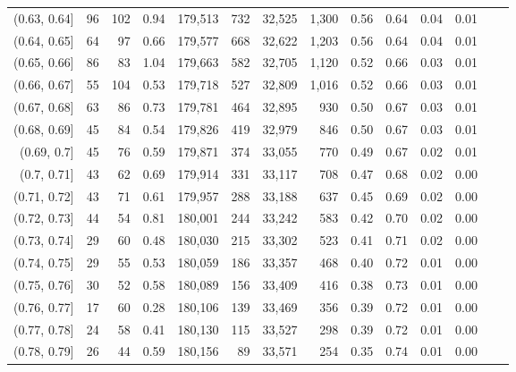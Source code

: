 \begin{tabular}{rrrrrrrrrrrrrr}
(0.63, 0.64]   &      96 &    102 &    0.94 &  179,513 &      732 &  32,525 &   1,300 &  0.56 &  0.64 &  0.04 &      0.01 \\
(0.64, 0.65]   &      64 &     97 &    0.66 &  179,577 &      668 &  32,622 &   1,203 &  0.56 &  0.64 &  0.04 &      0.01 \\
(0.65, 0.66]   &      86 &     83 &    1.04 &  179,663 &      582 &  32,705 &   1,120 &  0.52 &  0.66 &  0.03 &      0.01 \\
(0.66, 0.67]   &      55 &    104 &    0.53 &  179,718 &      527 &  32,809 &   1,016 &  0.52 &  0.66 &  0.03 &      0.01 \\
(0.67, 0.68]   &      63 &     86 &    0.73 &  179,781 &      464 &  32,895 &     930 &  0.50 &  0.67 &  0.03 &      0.01 \\
(0.68, 0.69]   &      45 &     84 &    0.54 &  179,826 &      419 &  32,979 &     846 &  0.50 &  0.67 &  0.03 &      0.01 \\
(0.69, 0.7]    &      45 &     76 &    0.59 &  179,871 &      374 &  33,055 &     770 &  0.49 &  0.67 &  0.02 &      0.01 \\
(0.7, 0.71]    &      43 &     62 &    0.69 &  179,914 &      331 &  33,117 &     708 &  0.47 &  0.68 &  0.02 &      0.00 \\
(0.71, 0.72]   &      43 &     71 &    0.61 &  179,957 &      288 &  33,188 &     637 &  0.45 &  0.69 &  0.02 &      0.00 \\
(0.72, 0.73]   &      44 &     54 &    0.81 &  180,001 &      244 &  33,242 &     583 &  0.42 &  0.70 &  0.02 &      0.00 \\
(0.73, 0.74]   &      29 &     60 &    0.48 &  180,030 &      215 &  33,302 &     523 &  0.41 &  0.71 &  0.02 &      0.00 \\
(0.74, 0.75]   &      29 &     55 &    0.53 &  180,059 &      186 &  33,357 &     468 &  0.40 &  0.72 &  0.01 &      0.00 \\
(0.75, 0.76]   &      30 &     52 &    0.58 &  180,089 &      156 &  33,409 &     416 &  0.38 &  0.73 &  0.01 &      0.00 \\
(0.76, 0.77]   &      17 &     60 &    0.28 &  180,106 &      139 &  33,469 &     356 &  0.39 &  0.72 &  0.01 &      0.00 \\
(0.77, 0.78]   &      24 &     58 &    0.41 &  180,130 &      115 &  33,527 &     298 &  0.39 &  0.72 &  0.01 &      0.00 \\
(0.78, 0.79]   &      26 &     44 &    0.59 &  180,156 &       89 &  33,571 &     254 &  0.35 &  0.74 &  0.01 &      0.00 \\

\end{tabular}
